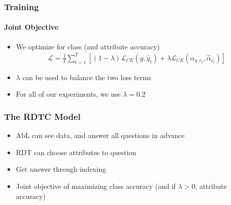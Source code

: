 \documentclass[9pt]{beamer}
\begin{document}
\begin{frame}
\frametitle{Training}
\framesubtitle{Joint Objective}
\begin{itemize}
	\item We optimize for class (and attribute accuracy)
	\begin{align*}
	\mathcal{L} = \frac{1}{T}\sum_{t=1}^{T}\left[(1-\lambda)\mathcal{L}_{CE}(y,\hat{y}_t) + \lambda \mathcal{L}_{CE}(\alpha_{y,c_t},\hat{\alpha}_{c_t}) \right]
	\end{align*}
	\item $\lambda$ can be used to balance the two loss terms
	\item For all of our experiments, we use $\lambda=0.2$
\end{itemize}
\end{frame}



\begin{frame}
\frametitle{The RDTC Model \cite{alaniz2019explainable}}
\begin{itemize}
	\item AbL can see data, and answer all questions in advance
	\item RDT can choose attributes to question
	\item Get answer through indexing
	\item Joint objective of maximizing class accuracy (and if $\lambda>0$, attribute accuracy)
\end{itemize}
\end{frame}
\end{document}
